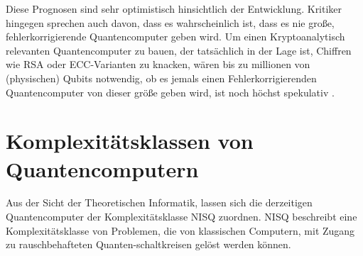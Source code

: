Diese Prognosen sind sehr optimistisch hinsichtlich der Entwicklung.
Kritiker hingegen sprechen auch davon, dass es wahrscheinlich ist, dass es nie große, fehlerkorrigierende Quantencomputer geben wird.
Um einen Kryptoanalytisch relevanten Quantencomputer zu bauen, der tatsächlich in der Lage ist, Chiffren wie RSA oder ECC-Varianten zu knacken,
wären bis zu millionen von (physischen) Qubits notwendig, ob es jemals einen Fehlerkorrigierenden Quantencomputer von dieser größe geben wird, ist noch höchst spekulativ \cite{aumassonSeriousCryptographyPractical2018}.


\section{Komplexitätsklassen von Quantencomputern}
Aus der Sicht der Theoretischen Informatik, lassen sich die derzeitigen Quantencomputer der Komplexitätsklasse NISQ zuordnen.
NISQ beschreibt eine Komplexitätsklasse von Problemen, die von klassischen Computern, mit Zugang zu rauschbehafteten Quanten-schaltkreisen gelöst werden können.

